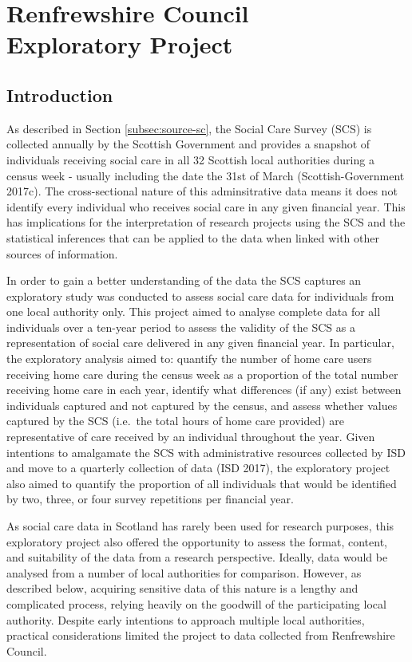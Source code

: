 \documentclass[]{article}
\title{}
\author{}
\date{}
\begin{document}
\chapter[Renfrewshire Council Exploratory Project]{Renfrewshire Council \\ Exploratory Project}\label{ch:renfrew}

\section{Introduction}\label{renf-intro}

As described in Section \ref{subsec:source-sc}, the Social Care Survey
(SCS) is collected annually by the Scottish Government and provides a
snapshot of individuals receiving social care in all 32 Scottish local
authorities during a census week - usually including the date the 31st
of March (Scottish-Government 2017c). The cross-sectional nature of this
adminsitrative data means it does not identify every individual who
receives social care in any given financial year. This has implications
for the interpretation of research projects using the SCS and the
statistical inferences that can be applied to the data when linked with
other sources of information.

In order to gain a better understanding of the data the SCS captures an
exploratory study was conducted to assess social care data for
individuals from one local authority only. This project aimed to analyse
complete data for all individuals over a ten-year period to assess the
validity of the SCS as a representation of social care delivered in any
given financial year. In particular, the exploratory analysis aimed to:
quantify the number of home care users receiving home care during the
census week as a proportion of the total number receiving home care in
each year, identify what differences (if any) exist between individuals
captured and not captured by the census, and assess whether values
captured by the SCS (i.e.~the total hours of home care provided) are
representative of care received by an individual throughout the year.
Given intentions to amalgamate the SCS with administrative resources
collected by ISD and move to a quarterly collection of data (ISD 2017),
the exploratory project also aimed to quantify the proportion of all
individuals that would be identified by two, three, or four survey
repetitions per financial year.

As social care data in Scotland has rarely been used for research
purposes, this exploratory project also offered the opportunity to
assess the format, content, and suitability of the data from a research
perspective. Ideally, data would be analysed from a number of local
authorities for comparison. However, as described below, acquiring
sensitive data of this nature is a lengthy and complicated process,
relying heavily on the goodwill of the participating local authority.
Despite early intentions to approach multiple local authorities,
practical considerations limited the project to data collected from
Renfrewshire Council.
\end{document}
